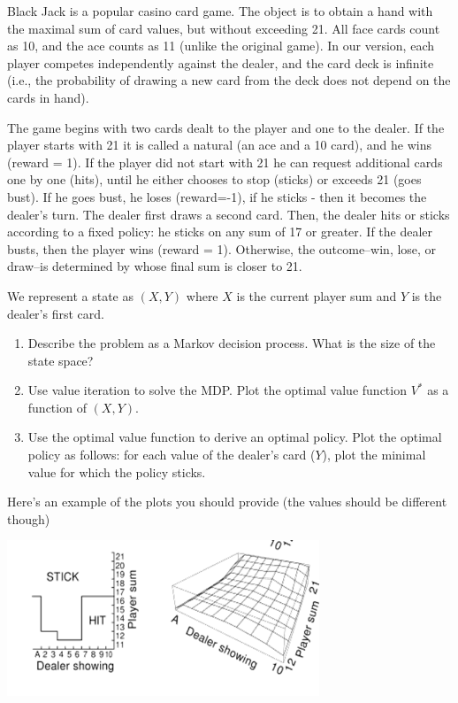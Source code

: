 \begin{exercise}
Black Jack is a popular casino card game. The object is to obtain a hand with the maximal sum of card values, but without exceeding 21. All face cards count as 10, and the ace counts as 11 (unlike the original game). In our version, each player competes independently against the dealer, and the card deck is infinite (i.e., the probability of drawing a new card from the deck does not depend on the cards in hand).

The game begins with two cards dealt to the player and one to the dealer. If the player starts with 21 it is called a natural (an ace and a 10 card), and he wins (reward = 1).
If the player did not start with 21 he can request additional cards one by one (hits), until he either chooses to stop (sticks) or exceeds 21 (goes bust). If he goes bust, he loses (reward=-1), if he sticks - then it becomes the dealer's turn.
The dealer first draws a second card. Then, the dealer hits or sticks according to a fixed policy: he sticks on any sum of 17 or greater.
If the dealer busts, then the player wins (reward = 1). Otherwise, the outcome--win, lose, or draw--is determined by whose final sum is closer to 21.

We represent a state as $\left( {X,Y} \right)$ where $X$  is the current player sum and $Y$ is the dealer's first card.
\begin{enumerate}
  \item Describe the problem as a Markov decision process. What is the size of the state space?
  \item Use value iteration to solve the MDP. Plot the optimal value function ${V^*}$ as a function of $\left( {X,Y} \right)$.
  \item Use the optimal value function to derive an optimal policy. Plot the optimal policy as follows: for each value of the dealer's card ($Y$), plot the minimal value for which the policy sticks.
\end{enumerate}
Here's an example of the plots you should provide (the values should be different though)
\begin{center}
\includegraphics[width=0.7\textwidth]{hw3_b}
\end{center}
\end{exercise}

